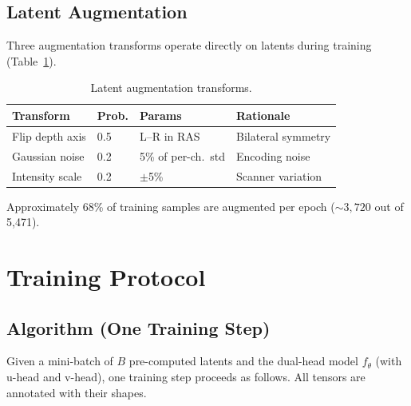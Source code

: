 \documentclass[11pt,a4paper]{article}
\begin{document}
\subsection{Latent Augmentation}

Three augmentation transforms operate directly on latents during training
(Table~\ref{tab:augmentation}).

\begin{table}[ht]
\centering
\caption{Latent augmentation transforms.}
\label{tab:augmentation}
\begin{tabular}{llll}
\toprule
\textbf{Transform} & \textbf{Prob.} & \textbf{Params} & \textbf{Rationale} \\
\midrule
Flip depth axis   & 0.5 & L--R in RAS        & Bilateral symmetry \\
Gaussian noise    & 0.2 & 5\% of per-ch.\ std & Encoding noise \\
Intensity scale   & 0.2 & $\pm$5\%            & Scanner variation \\
\bottomrule
\end{tabular}
\end{table}

Approximately 68\% of training samples are augmented per epoch
(${\sim}3{,}720$ out of 5,471).


\section{Training Protocol}
\label{sec:training}

\subsection{Algorithm (One Training Step)}
\label{sec:algorithm}

Given a mini-batch of $B$ pre-computed latents and the dual-head model
$f_\theta$ (with u-head and v-head), one training step proceeds as follows.
All tensors are annotated with their shapes.
\end{document}
